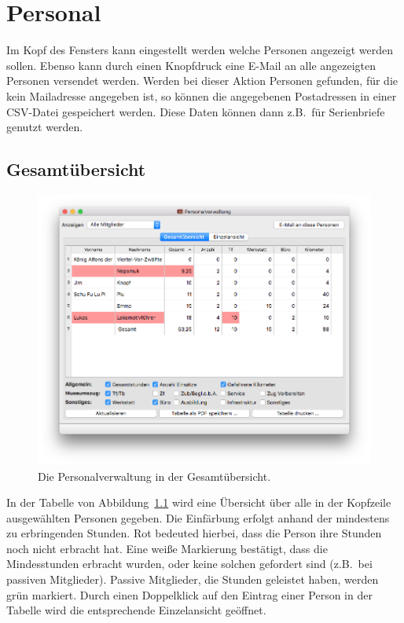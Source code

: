 \chapter{Personal}\label{personal}
Im Kopf des Fensters kann eingestellt werden welche Personen angezeigt werden sollen.
Ebenso kann durch einen Knopfdruck eine E-Mail an alle angezeigten Personen versendet werden.
Werden bei dieser Aktion Personen gefunden, für die kein Mailadresse angegeben ist, so können die angegebenen Postadressen in einer CSV-Datei gespeichert werden.
Diese Daten können dann z.B.\ für Serienbriefe genutzt werden.

\section{Gesamtübersicht}\label{personal:gesamtansicht}
\begin{figure}[!h]
	\includegraphics[width=\textwidth]{img/personal_gesamt}
	\caption{Die Personalverwaltung in der Gesamtübersicht.}
	\label{fig:personal:gesamt}
\end{figure}
In der Tabelle von Abbildung~\ref{fig:personal:gesamt} wird eine Übersicht über alle in der Kopfzeile ausgewählten Personen gegeben.
Die Einfärbung erfolgt anhand der mindestens zu erbringenden Stunden.
Rot bedeuted hierbei, dass die Person ihre Stunden noch nicht erbracht hat.
Eine weiße Markierung bestätigt, dass die Mindesstunden erbracht wurden, oder keine solchen gefordert sind (z.B.\ bei passiven Mitglieder).
Passive Mitglieder, die Stunden geleistet haben, werden grün markiert.
Durch einen Doppelklick auf den Eintrag einer Person in der Tabelle wird die entsprechende Einzelansicht geöffnet.


